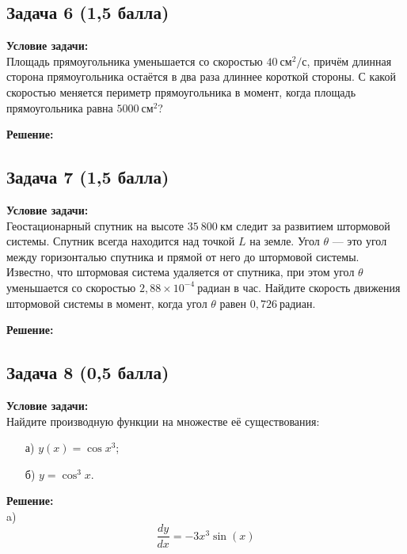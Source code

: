 \documentclass[a4paper,12pt]{article}
\begin{document}
\subsection{Задача 6 (1,5 балла)}
\textbf{Условие задачи:} \\
Площадь прямоугольника уменьшается со скоростью \( 40 \ \text{см}^2/\text{с} \), причём длинная сторона прямоугольника остаётся в два раза длиннее короткой стороны. С какой скоростью меняется периметр прямоугольника в момент, когда площадь прямоугольника равна \( 5000 \ \text{см}^2 \)?

\textbf{Решение:} \\

\vspace{1cm}

\subsection{Задача 7 (1,5 балла)}
\textbf{Условие задачи:} \\
Геостационарный спутник на высоте \( 35 \ 800 \ \text{км} \) следит за развитием штормовой системы. Спутник всегда находится над точкой \( L \) на земле. Угол \( \theta \) — это угол между горизонталью спутника и прямой от него до штормовой системы. Известно, что штормовая система удаляется от спутника, при этом угол \( \theta \) уменьшается со скоростью \( 2,88 \times 10^{-4} \ \text{радиан в час} \). Найдите скорость движения штормовой системы в момент, когда угол \( \theta \) равен \( 0,726 \ \text{радиан} \).

\textbf{Решение:} \\

\vspace{1cm}

\subsection{Задача 8 (0,5 балла)}
\textbf{Условие задачи:} \\
Найдите производную функции на множестве её существования:
\begin{itemize}
    \item[а)] \( y(x) = \cos x^3 \);
    \item[б)] \( y = \cos^3 x \).
\end{itemize}

\textbf{Решение:} \\

a) \[
\frac{dy}{dx} = -3x^3 \sin(x)
\]
\end{document}

